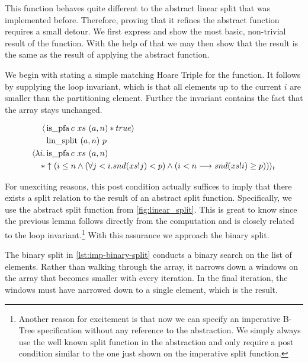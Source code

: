 This function behaves quite different to the abstract linear split
that was implemented before.
Therefore, proving that it refines the abstract function requires a small detour.
We first express and show the most basic, non-trivial result of the function.
With the help of that we may then show that the result is the same as the result
of applying the abstract function.

We begin with stating a simple matching Hoare Triple
for the function.
It follows by supplying the loop invariant,
which is that all elements up to the current $i$
are smaller than the partitioning element.
Further the invariant contains the fact that the array stays unchanged.

\begin{lemma}
    \begin{align*}
        \langle &\operatorname{is\_pfa} c\ xs\ (a,n) * true \rangle \\
                  &\operatorname{lin\_split}\ (a,n)\ p \\
        \langle \lambda i. & \operatorname{is\_pfa} c\ xs\ (a,n) \\
        * &\uparrow(i \leq n 
            \wedge (\forall j < i. snd (xs!j) < p) 
            \wedge (i<n \longrightarrow snd (xs!i) \geq p)) \rangle_t 
    \end{align*}
\end{lemma}

For unexciting reasons, this post condition
actually suffices to imply that there exists a split relation
to the result of an abstract split function.
Specifically, we use the abstract split function from
\autoref{fig:linear_split}. %
This is great to know since the previous lemma
follows directly from the computation and is closely related
to the loop invariant.\footnote{
    Another reason for excitement is that now we can specify an imperative B-Tree
    specification without any reference to the abstraction.
    We simply always use the well known split function in the abstraction
    and only require a post condition similar to the one just shown
    on the imperative split function.
}
With this assurance we approach the binary split.

The binary split in \autoref{lst:imp-binary-split} conducts a binary search on
the list of elements.
Rather than walking through the array,
it narrows down a windows on the array that becomes smaller with
every iteration.
In the final iteration,
the windows must have narrowed down to a single element,
which is the result.

